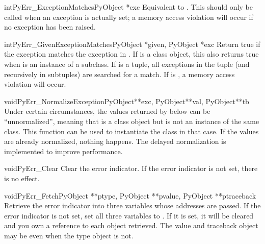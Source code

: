 \begin{cfuncdesc}{int}{PyErr_ExceptionMatches}{PyObject *exc}
  Equivalent to .  This should only be called when an exception is
  actually set; a memory access violation will occur if no exception
  has been raised.
\end{cfuncdesc}

\begin{cfuncdesc}{int}{PyErr_GivenExceptionMatches}{PyObject *given, PyObject *exc}
  Return true if the  exception matches the exception in
  .  If  is a class object, this also returns true
  when  is an instance of a subclass.  If  is a
  tuple, all exceptions in the tuple (and recursively in subtuples)
  are searched for a match.  If  is \NULL, a memory access
  violation will occur.
\end{cfuncdesc}

\begin{cfuncdesc}{void}{PyErr_NormalizeException}{PyObject**exc, PyObject**val, PyObject**tb}
  Under certain circumstances, the values returned by
   below can be ``unnormalized'', meaning
  that  is a class object but  is
  not an instance of the  same class.  This function can be used to
  instantiate the class in that case.  If the values are already
  normalized, nothing happens.  The delayed normalization is
  implemented to improve performance.
\end{cfuncdesc}

\begin{cfuncdesc}{void}{PyErr_Clear}{}
  Clear the error indicator.  If the error indicator is not set, there
  is no effect.
\end{cfuncdesc}

\begin{cfuncdesc}{void}{PyErr_Fetch}{PyObject **ptype, PyObject **pvalue,
                                     PyObject **ptraceback}
  Retrieve the error indicator into three variables whose addresses
  are passed.  If the error indicator is not set, set all three
  variables to \NULL.  If it is set, it will be cleared and you own a
  reference to each object retrieved.  The value and traceback object
  may be \NULL{} even when the type object is not.  
\end{cfuncdesc}

